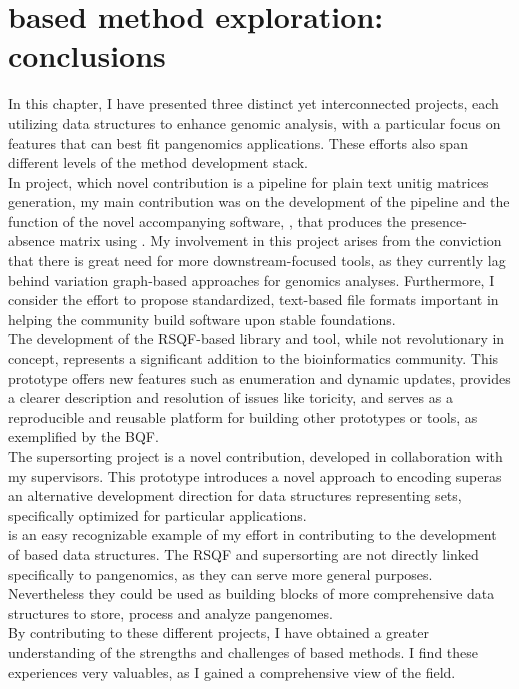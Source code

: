 \section{\kmer based method exploration: conclusions}
In this chapter, I have presented three distinct yet interconnected projects, each utilizing \kmer data structures to enhance genomic analysis, with a particular focus on features that can best fit pangenomics applications. These efforts also span different levels of the method development stack.\\
In \muset project, which novel contribution is a pipeline for plain text unitig matrices generation, my main contribution was on the development of the pipeline and the function of the novel accompanying software, \kmat, that produces the presence-absence matrix using \ggcat. My involvement in this project arises from the conviction that there is great need for more downstream-focused \kmer tools, as they currently lag behind variation graph-based approaches for genomics analyses. Furthermore, I consider the effort to propose standardized, text-based file formats important in helping the community build software upon stable foundations.\\
The development of the RSQF-based library and tool, while not revolutionary in concept, represents a significant addition to the bioinformatics community. This prototype offers new features such as enumeration and dynamic updates, provides a clearer description and resolution of issues like toricity, and serves as a reproducible and reusable platform for building other prototypes or tools, as exemplified by the BQF.\\
The super\kmer sorting project is a novel contribution, developed in collaboration with my supervisors. This prototype introduces a novel approach to encoding super\kmers as an alternative development direction for data structures representing \kmer sets, specifically optimized for particular applications.\\
\muset is an easy recognizable example of my effort in contributing to the development of \kmer based data structures. The RSQF and super\kmer sorting are not directly linked specifically to pangenomics, as they can serve more general purposes. Nevertheless they could be used as building blocks of more comprehensive data structures to store, process and analyze pangenomes.\\
By contributing to these different projects, I have obtained a greater understanding of the strengths and challenges of \kmer based methods. I find these experiences very valuables, as I gained a comprehensive view of the field.

\printbibliography